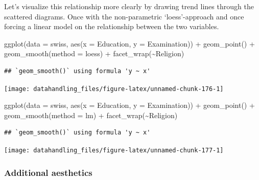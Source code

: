 \documentclass[
  12pt,
]{style/krantz}
\newenvironment{Shaded}{\begin{snugshade}}{\end{snugshade}}
\newcommand{\AttributeTok}[1]{\textcolor[rgb]{0.77,0.63,0.00}{#1}}
\newcommand{\FunctionTok}[1]{\textcolor[rgb]{0.00,0.00,0.00}{#1}}
\newcommand{\NormalTok}[1]{#1}
\newcommand{\SpecialCharTok}[1]{\textcolor[rgb]{0.00,0.00,0.00}{#1}}
\newcommand{\StringTok}[1]{\textcolor[rgb]{0.31,0.60,0.02}{#1}}
\begin{document}
Let's visualize this relationship more clearly by drawing trend lines through the scattered diagrams. Once with the non-parametric `loess'-approach and once forcing a linear model on the relationship between the two variables.

\begin{Shaded}
\begin{Highlighting}[]
\FunctionTok{ggplot}\NormalTok{(}\AttributeTok{data =}\NormalTok{ swiss, }\FunctionTok{aes}\NormalTok{(}\AttributeTok{x =}\NormalTok{ Education, }\AttributeTok{y =}\NormalTok{ Examination)) }\SpecialCharTok{+}
     \FunctionTok{geom\_point}\NormalTok{() }\SpecialCharTok{+}
     \FunctionTok{geom\_smooth}\NormalTok{(}\AttributeTok{method =} \StringTok{\textquotesingle{}loess\textquotesingle{}}\NormalTok{) }\SpecialCharTok{+}
     \FunctionTok{facet\_wrap}\NormalTok{(}\SpecialCharTok{\textasciitilde{}}\NormalTok{Religion)}
\end{Highlighting}
\end{Shaded}

\begin{verbatim}
## `geom_smooth()` using formula 'y ~ x'
\end{verbatim}

\texttt{[image: datahandling\_files/figure-latex/unnamed-chunk-176-1]}

\begin{Shaded}
\begin{Highlighting}[]
\FunctionTok{ggplot}\NormalTok{(}\AttributeTok{data =}\NormalTok{ swiss, }\FunctionTok{aes}\NormalTok{(}\AttributeTok{x =}\NormalTok{ Education, }\AttributeTok{y =}\NormalTok{ Examination)) }\SpecialCharTok{+}
     \FunctionTok{geom\_point}\NormalTok{() }\SpecialCharTok{+}
     \FunctionTok{geom\_smooth}\NormalTok{(}\AttributeTok{method =} \StringTok{\textquotesingle{}lm\textquotesingle{}}\NormalTok{) }\SpecialCharTok{+}
     \FunctionTok{facet\_wrap}\NormalTok{(}\SpecialCharTok{\textasciitilde{}}\NormalTok{Religion)}
\end{Highlighting}
\end{Shaded}

\begin{verbatim}
## `geom_smooth()` using formula 'y ~ x'
\end{verbatim}

\texttt{[image: datahandling\_files/figure-latex/unnamed-chunk-177-1]}

\hypertarget{additional-aesthetics}{%
\subsubsection{Additional aesthetics}\label{additional-aesthetics}}
\end{document}
